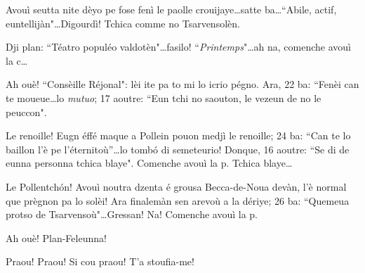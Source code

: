 

\DramPer


 

\begin{drama}

\Laurentspeaks Avouì seutta nite dèyo pe fose fenì le paolle crouijaye\ldots satte ba\ldots ``Abile, actif, euntellijàn"\ldots Digourdì! Tchica comme no Tsarvensolèn.


\Laurentspeaks Dji plan: ``Téatro populéo valdotèn"\ldots fasilo! ``\textit{Printemps}"\ldots ah na, comenche avouì la c\ldots


\Laurentspeaks Ah ouè! ``Consèille Réjonal": lèi ite pa to mi lo icrio pégno. Ara, 22 ba: ``Fenèi can te moueue\ldots lo \textit{mutuo}; 17 aoutre: ``Eun tchi no saouton, le vezeun de no le peuccon".


\Laurentspeaks Le renoille! Eugn éffé maque a Pollein pouon medjì le renoille; 24 ba: ``Can te lo baillon l'è pe l'éternitoù''\ldots lo tomb\'o di semeteurio! Donque, 16 aoutre: ``Se di de eunna personna tchica blaye". Comenche avouì la p. Tchica blaye\ldots


\Laurentspeaks Le Pollentch\'on! Avouì noutra dzenta é grousa Becca-de-Noua devàn, l'è normal que prègnon pa lo solèi! Ara finalemàn sen arevoù a la dériye; 26 ba: ``Quemeua protso de Tsarvensoù"\ldots Gressan! Na! Comenche avouì la p.


\Laurentspeaks Ah ouè! Plan-Feleunna!


\Taniaspeaks{} Praou! Praou! Si cou praou! T'a stoufia-me!


\end{drama}
